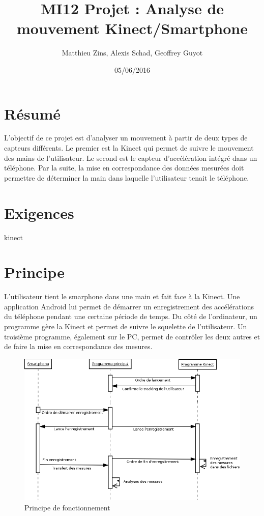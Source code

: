 \documentclass[12pt, french]{article}
\begin{document}
\title{MI12 Projet : Analyse de mouvement Kinect/Smartphone}
\author{Matthieu Zins, Alexis Schad, Geoffrey Guyot}
\date{05/06/2016}


\maketitle

\section{Résumé}

L'objectif de ce projet est d'analyser un mouvement à partir de deux types de capteurs différents. Le premier est la Kinect qui permet de suivre le mouvement des mains de l'utilisateur. Le second est le capteur d'accélération intégré dans un téléphone. Par la suite, la mise en correspondance des données mesurées doit permettre de déterminer la main dans laquelle l'utilisateur tenait le téléphone.

\section{Exigences}

kinect 



\section{Principe}
L'utilisateur tient le smarphone dans une main et fait face à la Kinect. Une application Android lui permet de démarrer un enregistrement des accélérations du téléphone pendant une certaine période de temps. Du côté de l'ordinateur, un programme gère la Kinect et permet de suivre le squelette de l'utilisateur. Un troisième programme, également sur le PC, permet de contrôler les deux autres et de faire la mise en correspondance des mesures.

\begin{figure}[H]
\centering
\includegraphics[scale=0.35]{diagramme_com.png}
\caption{Principe de fonctionnement}
\label{fig0}
\end{figure}
\end{document}
